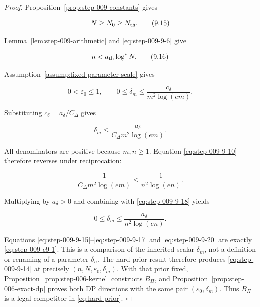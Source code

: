 \begin{proof}
Proposition~\ref{prop:step-009-constants} gives

\[
N\ge N_0\ge N_{\rm th}.
\tag{9.15}\label{eq:step-009-9-15}
\]

Lemma~\ref{lem:step-009-arithmetic} and \eqref{eq:step-009-9-6} give

\[
n<a_{\rm th}\log^*N.
\tag{9.16}\label{eq:step-009-9-16}
\]

Assumption~\ref{assump:fixed-parameter-scale} gives

\[
0<\varepsilon_0\le1,
\qquad
0\le\delta_m
\le\frac{c_\delta}{m^2\log(em)}.
\tag{9.17}\label{eq:step-009-9-17}
\]

Substituting \(c_\delta=a_\delta/C_\Delta\) gives

\[
\delta_m
\le
\frac{a_\delta}{C_\Delta m^2\log(em)}.
\tag{9.18}\label{eq:step-009-9-18}
\]

All denominators are positive because \(m,n\ge1\).  Equation \eqref{eq:step-009-9-10}
therefore reverses under reciprocation:

\[
\frac1{C_\Delta m^2\log(em)}
\le
\frac1{n^2\log(en)}.
\tag{9.19}\label{eq:step-009-9-19}
\]

Multiplying by \(a_\delta>0\) and combining with \eqref{eq:step-009-9-18} yields

\[
0\le\delta_m
\le\frac{a_\delta}{n^2\log(en)}.
\tag{9.20}\label{eq:step-009-9-20}
\]

Equations \eqref{eq:step-009-9-15}--\eqref{eq:step-009-9-17} and \eqref{eq:step-009-9-20} are exactly \eqref{eq:step-009-c9-1}.  This is a
comparison of the inherited scalar \(\delta_m\), not a definition or
renaming of a parameter \(\delta_n\).  The hard-prior result
therefore produces \eqref{eq:step-009-9-14} at precisely
\((n,N,\varepsilon_0,\delta_m)\).  With that prior fixed,
Proposition~\ref{prop:step-006-kernel} constructs \(B_\Pi\), and
Proposition~\ref{prop:step-006-exact-dp} proves both DP directions with
the same pair \((\varepsilon_0,\delta_m)\).  Thus \(B_\Pi\) is a legal
competitor in \eqref{eq:hard-prior}.  \(\square\)

\end{proof}


